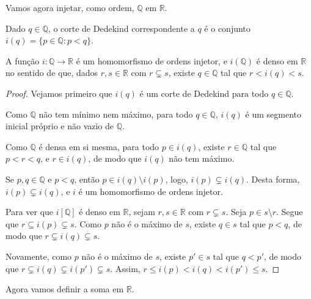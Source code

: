 Vamos agora injetar, como ordem, $\mathbb Q$ em $\mathbb R$.
\begin{definition}
        Dado $q \in \mathbb Q$, o corte de Dedekind correspondente a $q$ é o conjunto $i(q) = \{p\in\mathbb Q : p<q\}$.
\end{definition}
\begin{proposition}
    A função $i:\mathbb Q\to \mathbb R$ é um homomorfismo de ordens injetor, e $i(\mathbb Q)$ é denso em $\mathbb R$ no sentido de que, dados $r, s \in \mathbb R$ com $r\subsetneq s$, existe $q\in\mathbb Q$ tal que $r<i(q)<s$.
\end{proposition}
\begin{proof}
    Vejamos primeiro que $i(q)$ é um corte de Dedekind para todo $q\in\mathbb Q$.

    Como $\mathbb Q$ não tem mínimo nem máximo, para todo $q\in\mathbb Q$, $i(q)$ é um segmento inicial próprio e não vazio de $\mathbb Q$.

    Como $\mathbb Q$ é densa em si mesma, para todo $p\in i(q)$, existe $r\in\mathbb Q$ tal que $p<r<q$, e $r\in i(q)$, de modo que $i(q)$ não tem máximo.

    Se $p, q \in \mathbb Q$ e  $p<q$, então $p \in i(q)\setminus i(p)$, logo, $i(p)\subsetneq i(q)$.
    Desta forma, $i(p)\subsetneq i(q)$, e $i$ é um homomorfismo de ordens injetor.

    Para ver que $i[\mathbb Q]$ é denso em $\mathbb R$, sejam $r, s \in \mathbb R$ com $r\subsetneq s$.
    Seja $p\in s\setminus r$.
    Segue que $r\subseteq i(p)\subsetneq s$.
    Como $p$ não é o máximo de $s$, existe $q\in s$ tal que $p<q$, de modo que $r\subsetneq i(q)\subsetneq s$.

    Novamente, como $p$ não é o máximo de $s$, existe $p'\in s$ tal que $q<p'$, de modo que $r\subsetneq i(q)\subsetneq i(p')\subsetneq s$.
    Assim, $r\leq i(p)<i(q)<i(p')\leq s$.
\end{proof}

Agora vamos definir a soma em $\mathbb R$.

